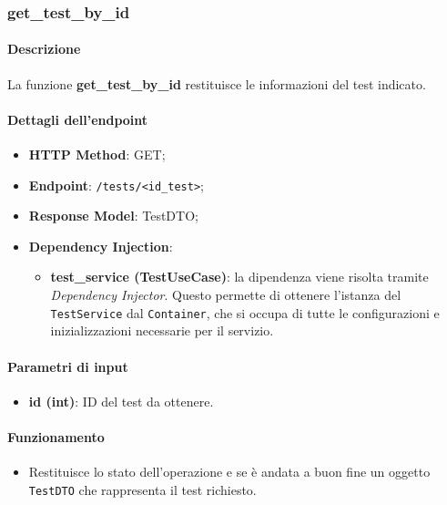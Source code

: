 \subsubsection{get\_test\_by\_id}
\label{subsubsec:get_test_by_id}

\paragraph{Descrizione}
La funzione \textbf{get\_test\_by\_id} restituisce le informazioni del test indicato.

\paragraph{Dettagli dell'endpoint}
\begin{itemize}
    \item \textbf{HTTP Method}: GET;
    \item \textbf{Endpoint}: \texttt{/tests/<id\_test>};
    \item \textbf{Response Model}: TestDTO;
    \item \textbf{Dependency Injection}: 
    \begin{itemize}
        \item \textbf{test\_service (TestUseCase)}: la dipendenza viene risolta tramite \textit{Dependency Injector}. Questo permette di ottenere l'istanza del \texttt{TestService} dal \texttt{Container}, che si occupa di tutte le configurazioni e inizializzazioni necessarie per il servizio.
    \end{itemize}
\end{itemize}

\paragraph{Parametri di input}
\begin{itemize}
    \item \textbf{id (int)}: ID del test da ottenere.
\end{itemize}

\paragraph{Funzionamento}
\begin{itemize}
    \item Restituisce lo stato dell'operazione e se è andata a buon fine un oggetto \texttt{TestDTO} che rappresenta il test richiesto.
\end{itemize}

